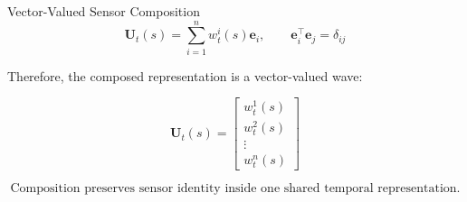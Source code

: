 \begin{frame}[allowframebreaks]{Vector-Valued Sensor Composition}
        \begin{equation}
            \mathbf{U}_t(s)
            =
            \sum_{i=1}^{n}
            w_t^i(s)\mathbf{e}_i,
            \qquad
            \mathbf{e}_i^{\top}\mathbf{e}_j
            =
            \delta_{ij}
        \end{equation}
        
        Therefore, the composed representation is a vector-valued wave:
        
        \begin{equation}
            \mathbf{U}_t(s)
            =
            \begin{bmatrix}
                w_t^1(s) \\
                w_t^2(s) \\
                \vdots \\
                w_t^n(s)
            \end{bmatrix}
        \end{equation}
        
        \[
            \text{Composition preserves sensor identity inside one shared temporal representation.}
        \]
    
    
    \end{frame}
